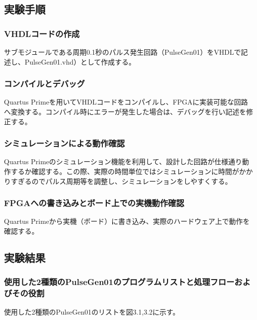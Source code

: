\documentclass{jlreq}
\numberwithin{equation}{section}
\begin{document}
\subsection{実験手順}

\subsubsection{VHDLコードの作成}
サブモジュールである周期0.1秒のパルス発生回路（PulseGen01）をVHDLで記述し、PulseGen01.vhd）として作成する。

\subsubsection{コンパイルとデバッグ}
Quartus Primeを用いてVHDLコードをコンパイルし、FPGAに実装可能な回路へ変換する。コンパイル時にエラーが発生した場合は、デバッグを行い記述を修正する。

\subsubsection{シミュレーションによる動作確認}
Quartus Primeのシミュレーション機能を利用して、設計した回路が仕様通り動作するか確認する。この際、実際の時間単位ではシミュレーションに時間がかかりすぎるのでパルス周期等を調整し、シミュレーションをしやすくする。

\subsubsection{FPGAへの書き込みとボード上での実機動作確認}
Quartus Primeから実機（ボード）に書き込み、実際のハードウェア上で動作を確認する。

\subsection{実験結果}
\subsubsection{使用した2種類のPulseGen01のプログラムリストと処理フローおよびその役割}
使用した2種類のPulseGen01のリストを図3.1,3.2に示す。
\end{document}
